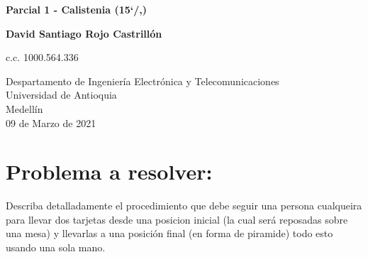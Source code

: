 \documentclass{article}
\begin{document}
\begin{titlepage}
    \begin{center}
        \vspace*{1cm}
            
        \Huge
        \textbf{Parcial 1 - Calistenia (15`/,)}
            
        \vspace{0.5cm}
        \LARGE
            
        \vspace{1.5cm}
            
        \textbf{David Santiago Rojo Castrillón}\par
        c.c. 1000.564.336
            
        \vfill
            
        \vspace{0.8cm}
            
        \Large
        Despartamento de Ingeniería Electrónica y Telecomunicaciones\\
        Universidad de Antioquia\\
        Medellín\\
        09 de Marzo de 2021
            
    \end{center}
\end{titlepage}

\tableofcontents
\newpage
\section{Problema a resolver:}\label{intro}
Describa detalladamente el procedimiento que debe seguir una persona cualqueira para llevar dos tarjetas desde una posicion inicial (la cual será reposadas sobre una mesa) y llevarlas a una posición final (en forma de piramide) todo esto usando una sola mano.
\end{document}
